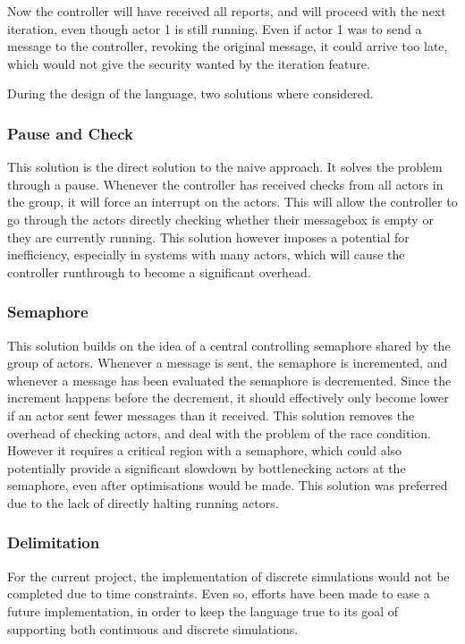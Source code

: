 Now the controller will have received all reports, and will proceed with the next iteration, even though actor 1 is still running. Even if actor 1 was to send a message to the controller, revoking the original message, it could arrive too late, which would not give the security wanted by the iteration feature.

During the design of the language, two solutions where considered.

\subsubsection{Pause and Check}

This solution is the direct solution to the naive approach. It solves the problem through a pause. Whenever the controller has received checks from all actors in the group, it will force an interrupt on the actors. This will allow the controller to go through the actors directly checking whether their messagebox is empty or they are currently running. This solution however imposes a potential for inefficiency, especially in systems with many actors, which will cause the controller runthrough to become a significant overhead.

\subsubsection{Semaphore}

This solution builds on the idea of a central controlling semaphore shared by the group of actors. Whenever a message is sent, the semaphore is incremented, and whenever a message has been evaluated the semaphore is decremented. Since the increment happens before the decrement, it should effectively only become lower if an actor sent fewer messages than it received. This solution removes the overhead of checking actors, and deal with the problem of the race condition. However it requires a critical region with a semaphore, which could also potentially provide a significant slowdown by bottlenecking actors at the semaphore, even after optimisations would be made. This solution was preferred due to the lack of directly halting running actors.

\subsubsection{Delimitation}

For the current project, the implementation of discrete simulations would not be completed due to time constraints. Even so, efforts have been made to ease a future implementation, in order to keep the language true to its goal of supporting both continuous and discrete simulations.